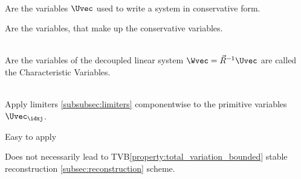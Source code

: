\begin{defnbox}\nospacing
    \begin{defn}\label{defn:conservative_variables}\leavevmode\\
        Are the variables $\Uvec$ used to write a system in conservative form.
    \end{defn}
\end{defnbox}
\begin{defnbox}\nospacing
    \begin{defn}\label{defn:primitive_variabels}
        Are the variables, that make up the conservative variables.
    \end{defn}
\end{defnbox}
\begin{defnbox}\nospacing
    \begin{defn}\label{defn:characteristic_variabels}\leavevmode\\
        Are the variables of the decoupled linear system $\Wvec=\vec{R}^{-1}\Uvec$ are called the Characteristic Variables.
    \end{defn}
\end{defnbox}
\begin{defnbox}\nospacing
    \begin{defn}\label{defn:primitive_reconstruction}\leavevmode\\
        Apply limiters \cref{subsubsec:limiters} componentwise to the primitive variables $\Uvec_{\idxj}$.
    \end{defn}
\end{defnbox}
\begin{sectionbox}\nospacing
   \begin{minipage}[t]{0.39\textwidth}
       \begin{proslist}
           \item Easy to apply
       \end{proslist}
   \end{minipage}
   \begin{minipage}[t]{0.6\textwidth}
      \begin{conslist}
          \item Does not necessarily lead to TVB\cref{property:total_variation_bounded} stable reconstruction \cref{subsec:reconstruction} scheme.
      \end{conslist}
   \end{minipage}
\end{sectionbox}
